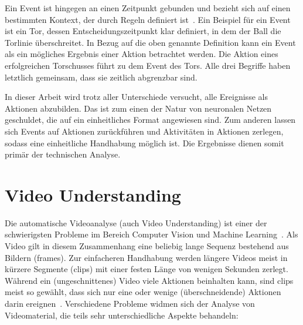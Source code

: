 Ein Event ist hingegen an einen Zeitpunkt gebunden und bezieht sich auf einen bestimmten Kontext, der durch Regeln definiert ist~\cite{Giancola18}.
Ein Beispiel für ein Event ist \ua ein Tor, dessen Entscheidungszeitpunkt klar definiert, in dem der Ball die Torlinie überschreitet.
In Bezug auf die oben genannte Definition kann ein Event als ein mögliches Ergebnis einer Aktion betrachtet werden.
Die Aktion eines erfolgreichen Torschusses führt \zB zu dem Event des Tors.
Alle drei Begriffe haben letztlich gemeinsam, dass sie zeitlich abgrenzbar sind.

In dieser Arbeit wird trotz aller Unterschiede versucht, alle Ereignisse als Aktionen abzubilden.
Das ist zum einen der Natur von neuronalen Netzen geschuldet, die auf ein einheitliches Format angewiesen sind.
Zum anderen lassen sich Events auf Aktionen zurückführen und Aktivitäten in Aktionen zerlegen, sodass eine einheitliche Handhabung möglich ist.
Die Ergebnisse dienen somit primär der technischen Analyse.


\section{Video Understanding}
\label{sec:video-understanding}

Die automatische Videoanalyse (auch Video Understanding) ist einer der schwierigsten Probleme im Bereich Computer Vision und Machine Learning~\cite{Sozykin17,Jiang19}.
Als Video gilt in diesem Zusammenhang eine beliebig lange Sequenz bestehend aus Bildern (\glspl{frame}).
Zur einfacheren Handhabung werden längere Videos meist in kürzere Segmente (\glspl{clip}) mit einer festen Länge von wenigen Sekunden zerlegt.
Während ein (ungeschnittenes) Video viele Aktionen beinhalten kann, sind \glspl{clip} meist so gewählt, dass sich nur eine oder wenige (überschneidende) Aktionen darin ereignen~\cite{Jiang19,Kay17}.
Verschiedene Probleme widmen sich der Analyse von Videomaterial, die teils sehr unterschiedliche Aspekte behandeln:

